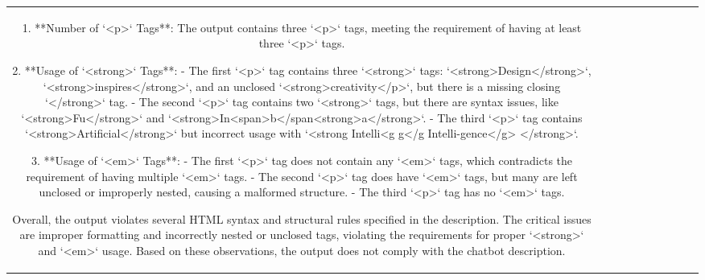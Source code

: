 \begin{table}[h!]
\begin{tabular}{|c|c|c|c|c|c|c|c|c|c|}
1. **Number of `<p>` Tags**: The output contains three `<p>` tags, meeting the requirement of having at least three `<p>` tags.

2. **Usage of `<strong>` Tags**: 
   - The first `<p>` tag contains three `<strong>` tags: `<strong>Design</strong>`, `<strong>inspires</strong>`, and an unclosed `<strong>creativity</p>`, but there is a missing closing `</strong>` tag.
   - The second `<p>` tag contains two `<strong>` tags, but there are syntax issues, like `<strong>Fu</strong>` and `<strong>In<span>b</span<strong>a</strong>`.
   - The third `<p>` tag contains `<strong>Artificial</strong>` but incorrect usage with `<strong Intelli<g g</g Intelli-gence</g> </strong>`.

3. **Usage of `<em>` Tags**: 
   - The first `<p>` tag does not contain any `<em>` tags, which contradicts the requirement of having multiple `<em>` tags.
   - The second `<p>` tag does have `<em>` tags, but many are left unclosed or improperly nested, causing a malformed structure.
   - The third `<p>` tag has no `<em>` tags.

Overall, the output violates several HTML syntax and structural rules specified in the description. The critical issues are improper formatting and incorrectly nested or unclosed tags, violating the requirements for proper `<strong>` and `<em>` usage. Based on these observations, the output does not comply with the chatbot description.


\end{tabular}
\end{table}
